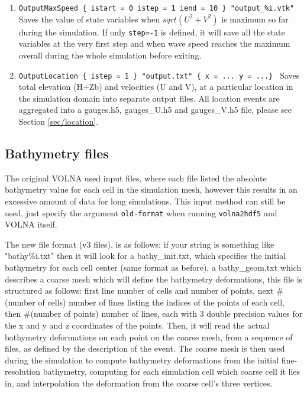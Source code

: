 \documentclass[11pt]{article}
\begin{document}
\begin{enumerate}
\item \texttt{OutputMaxSpeed \{ istart = 0 istep = 1 iend = 10 \} "output\_\%i.vtk" } \\
Saves the value of state variables when $sqrt(U^2+V^2)$ is maximum so far during the simulation. If only \texttt{step=-1} is defined, it will save all the state variables at the very first step and when wave speed reaches the maximum overall during the whole simulation before exiting.

\item \texttt{OutputLocation \{ istep = 1 \} "output.txt" \{ x = ... y = ...\} }
Saves total elevation (H+Zb) and velocities (U and V), at a particular location in the simulation domain into separate output files. All location events are aggregated into a gauges.h5, gauges\_U.h5 and gauges\_V.h5 file, please see Section \ref{sec/location}.

\end{enumerate}

\subsection{Bathymetry files} \label{sec/bathy}
The original VOLNA used input files, where each file listed the absolute bathymetry value for each cell in the simulation mesh, however this results in an excessive amount of data for long simulations. This input method can still be used, just specify the argument \texttt{old-format} when running \texttt{volna2hdf5} and VOLNA itself.

The new file format (v3 files), is as follows: if your string is something like "bathy\%i.txt" then it will look for a bathy\_init.txt, which specifies the initial bathymetry for each cell center (same format as before), a bathy\_geom.txt which describes a coarse mesh which will define the bathymetry deformations, this file is structured as follows: first line number of cells and number of points, next \#(number of cells) number of lines listing the indices of the points of each cell, then \#(number of points) number of lines, each with 3 double precision values for the x and y and z coordinates of the points. Then, it will read the actual bathymetry deformations on each point on the coarse mesh, from a sequence of files, as defined by the description of the event. The coarse mesh is then used during the simulation to compute bathymetry deformations from the initial fine-resolution bathymetry, computing for each simulation cell which coarse cell it lies in, and interpolation the deformation from the coarse cell's three vertices.
\end{document}
